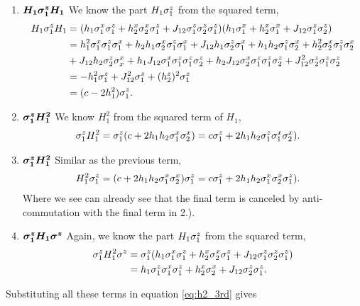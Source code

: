 \begin{enumerate}
    \item $\bm{H_1 {\sigma^{z}_1}H_1}$ \newline
    We know the part $H_1{\sigma^{z}_1}$ from the squared term,
    \begin{align*}
         H_1 {\sigma^{z}_1}H_1 & = (h_1 {\sigma^{x}_1} {\sigma^{z}_1} + h^x_2 {\sigma^{x}_2} {\sigma^{z}_1} + J_{12} {\sigma^{z}_1} {\sigma^{z}_2} {\sigma^{z}_1})(h_1 {\sigma^{x}_1} + h^x_2 {\sigma^{x}_1}  + J_{12} {\sigma^{z}_1} {\sigma^{z}_2})\\
         & = h_1^2 {\sigma^{x}_1} {\sigma^{z}_1} {\sigma^{x}_1} + h_2 h_1 {\sigma^{x}_2} {\sigma^{z}_1} {\sigma^{x}_1} + J_{12}h_1 {\sigma^{z}_2} {\sigma^{x}_1} + h_1 h_2 {\sigma^{z}_1}{\sigma^{x}_2} + h_2^2 {\sigma^{x}_2}{\sigma^{z}_1}{\sigma^{x}_2}\\
         & + J_{12} h_2 {\sigma^{z}_2} \sigma^{x}_x + h_1 J_{12} {\sigma^{x}_1} {\sigma^{z}_1}{\sigma^{z}_1}{\sigma^{z}_2} + h_2 J_{12} {\sigma^{x}_2} {\sigma^{z}_1}{\sigma^{z}_1}{\sigma^{z}_2} + J_{12}^2 {\sigma^{z}_2} {\sigma^{z}_1}{\sigma^{z}_2}\\
         & = -h_1^2 {\sigma^{z}_1} + J_{12}^2 {\sigma^{z}_1} + (h_2^z)^2 {\sigma^{z}_1} \\
         & = (c - 2 h_1^2) {\sigma^{z}_1}.
    \end{align*}
    \item $\bm{{\sigma^{z}_1} H_1^2}$ \newline
    We know $H_1^2$ from the squared term of $H_1$,
    \begin{align*}
        {\sigma^{z}_1} H_1^2 & = {\sigma^{z}_1}(c + 2h_1 h_2 {\sigma^{x}_1}{\sigma^{x}_2}) =  c{\sigma^{z}_1} + 2h_1 h_2 {\sigma^{z}_1}{\sigma^{x}_1}{\sigma^{x}_2}).
    \end{align*}
    \item $\bm{{\sigma^{z}_1} H_1^2}$ \newline
    Similar as the previous term,
    \begin{align*}
        H_1^2{\sigma^{z}_1}  & = (c + 2h_1 h_2 {\sigma^{x}_1}{\sigma^{x}_2}){\sigma^{z}_1} =  c{\sigma^{z}_1} + 2h_1 h_2 {\sigma^{x}_1}{\sigma^{x}_2}{\sigma^{z}_1}).
    \end{align*}
    Where we see can already see that the final term is canceled by anti-commutation with the final term in 2.).
    \item $\bm{{\sigma^{z}_1} H_1\sigma^{z}}$ \newline
    Again, we know the part $H_1{\sigma^{z}_1}$ from the squared term,
    \begin{align*}
        {\sigma^{z}_1} H_1^2\sigma^{z} & = {\sigma^{z}_1}(h_1 {\sigma^{x}_1} {\sigma^{z}_1} + h^x_2 {\sigma^{x}_2} {\sigma^{z}_1} + J_{12} {\sigma^{z}_1} {\sigma^{z}_2} {\sigma^{z}_1})\\
        & =  h_1 {\sigma^{z}_1} {\sigma^{x}_1} {\sigma^{z}_1} + h^x_2 {\sigma^{x}_2} + J_{12} {\sigma^{z}_2} {\sigma^{z}_1}.
    \end{align*}
\end{enumerate}
Substituting all these terms in equation \ref{eq:h2_3rd} gives
